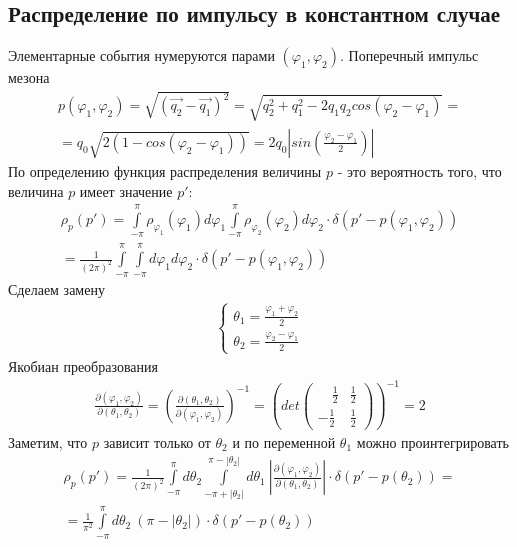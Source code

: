 \documentclass[12pt]{article}
\renewcommand{\l}{\left( }
\renewcommand{\r}{\right) }
\renewcommand{\phi}{\varphi}
\newcommand{\pd}{\partial}
\newcommand{\br}[1]{\l {#1} \r}
\newcommand{\pint}{\int\limits_{-\pi}^{\pi}}
\newcommand{\jacobian}[2]{\frac{\pd \br{#1}}{\pd \br{#2}}}
\newcommand{\abs}[1]{\left| #1 \right|}
\begin{document}
\subsection{Распределение по импульсу в константном случае}
Элементарные события нумеруются парами $\l \phi_1, \phi_2 \r$. Поперечный импульс мезона
\begin{eqnarray}
p \br{\phi_1, \phi_2} = \sqrt{\br{\vec{q_2} - \vec{q_1}}^2} = \sqrt{q_2^2 + q_1^2 - 2 q_1 q_2 cos \br{\phi_2 - \phi_1}} = \nonumber \\
= q_0 \sqrt{2 \br{1 - cos \br{ \phi_2 - \phi_1 }}} = 2 q_0 \left|{sin \br{\frac{\phi_2 - \phi_1}{2}}}\right|
\end{eqnarray}
По определению функция распределения величины $p$ - это вероятность того, что величина $p$ имеет значение $p'$:
\begin{eqnarray}
\rho_p \br{p'} = \pint \rho_{\phi_1} \br{\phi_1} d\phi_1 \pint \rho_{\phi_2} \br{\phi_2} d\phi_2 \cdot \delta \br{p' - p(\phi_1, \phi_2)} \nonumber \\
= \frac{1}{\br{2\pi}^2} \pint \pint d\phi_1 d\phi_2 \cdot \delta \br{p' - p(\phi_1, \phi_2)}
\end{eqnarray}
Сделаем замену
\begin{eqnarray}
\begin{cases}
\theta_1 = \frac{\phi_1 + \phi_2}{2} \\
\theta_2 = \frac{\phi_2 - \phi_1}{2}
\end{cases}
\nonumber
\end{eqnarray}
Якобиан преобразования
\begin{eqnarray}
\jacobian{\phi_1, \phi_2}{\theta_1, \theta_2} = \br{\jacobian{\theta_1, \theta_2}{\phi_1, \phi_2}}^{-1} = \br{det 
\begin{pmatrix}
\quad\frac{1}{2} & \frac{1}{2} \\
-\frac{1}{2} & \frac{1}{2}
\end{pmatrix}
}^{-1} = 2
\end{eqnarray}
Заметим, что $p$ зависит только от $\theta_2$ и по переменной $\theta_1$ можно проинтегрировать
\begin{eqnarray}
\rho_p \br{p'} = \frac{1}{\br{2\pi}^2} \pint d\theta_2 \int\limits_{-\pi + \abs{\theta_2}}^{\pi - \abs{\theta_2}} d\theta_1 \ \abs{\jacobian{\phi_1, \phi_2}{\theta_1, \theta_2}}\cdot \delta \br{p' - p \br{\theta_2}} = \nonumber \\
= \frac{1}{\pi^2} \pint d\theta_2 \ \br{\pi - \abs{\theta_2}} \cdot \delta \br{p' - p \br{\theta_2}}
\end{eqnarray}
\end{document}
